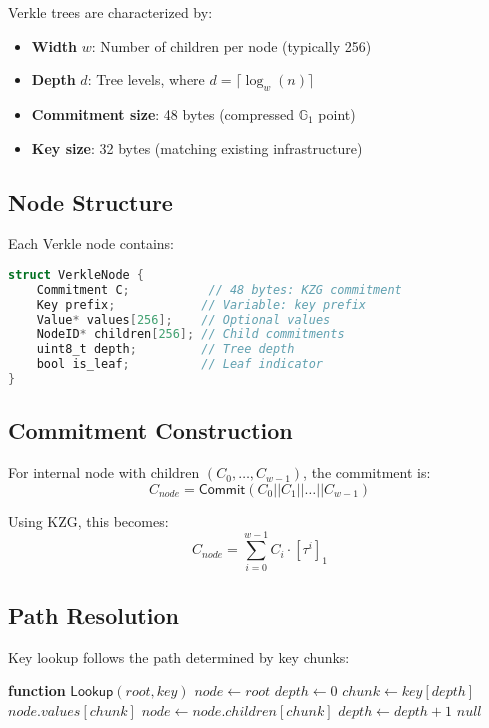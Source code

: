 \documentclass[11pt,a4paper]{article}
\theoremstyle{definition}
\begin{document}
Verkle trees are characterized by:
\begin{itemize}
    \item \textbf{Width} $w$: Number of children per node (typically 256)
    \item \textbf{Depth} $d$: Tree levels, where $d = \lceil \log_w(n) \rceil$
    \item \textbf{Commitment size}: 48 bytes (compressed $\mathbb{G}_1$ point)
    \item \textbf{Key size}: 32 bytes (matching existing infrastructure)
\end{itemize}

\subsection{Node Structure}

Each Verkle node contains:

\begin{lstlisting}[language=C,caption=Verkle Node Structure]
struct VerkleNode {
    Commitment C;           // 48 bytes: KZG commitment
    Key prefix;            // Variable: key prefix
    Value* values[256];    // Optional values
    NodeID* children[256]; // Child commitments
    uint8_t depth;         // Tree depth
    bool is_leaf;          // Leaf indicator
}
\end{lstlisting}

\subsection{Commitment Construction}

For internal node with children $(C_0, \ldots, C_{w-1})$, the commitment is:
\begin{equation}
    C_{node} = \mathsf{Commit}(C_0 || C_1 || \ldots || C_{w-1})
\end{equation}

Using KZG, this becomes:
\begin{equation}
    C_{node} = \sum_{i=0}^{w-1} C_i \cdot [\tau^i]_1
\end{equation}

\subsection{Path Resolution}

Key lookup follows the path determined by key chunks:
\begin{algorithmic}[1]
\STATE \textbf{function} $\mathsf{Lookup}(root, key)$
\STATE $node \gets root$
\STATE $depth \gets 0$
    \STATE $chunk \gets key[depth]$
        \RETURN $node.values[chunk]$
    \ENDIF
    \STATE $node \gets node.children[chunk]$
    \STATE $depth \gets depth + 1$
\ENDWHILE
\RETURN $null$
\end{algorithmic}
\end{document}
